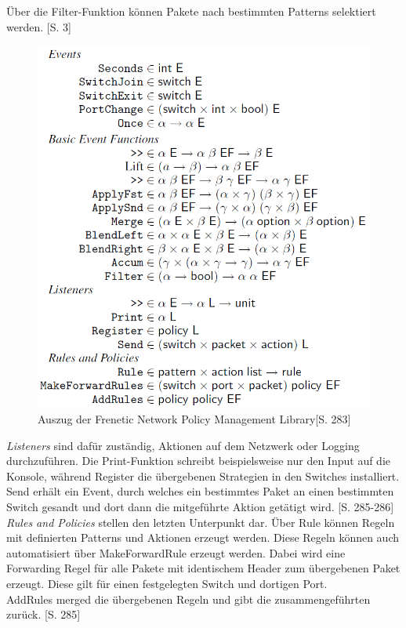 \documentclass[10pt,conference]{IEEEtran}
\begin{document}
Über die Filter-Funktion können Pakete nach bestimmten Patterns selektiert werden. \cite{3}[S. 3]
\begin{figure}[h]
	\centering
	\includegraphics[width=\columnwidth]{images/freneticNetworkPolicyManagementLibrary.PNG}
	\caption{Auszug der Frenetic Network Policy Management Library\cite{4}[S. 283]}
	\label{fig:freneticNetworkPolicyManagementLibrary}
\end{figure}
\newline
\textit{Listeners} sind dafür zuständig, Aktionen auf dem Netzwerk oder Logging durchzuführen. Die Print-Funktion schreibt beispielsweise nur den Input auf die Konsole, während Register die übergebenen Strategien in den Switches installiert. Send erhält ein Event, durch welches ein bestimmtes Paket an einen bestimmten Switch gesandt und dort dann die mitgeführte Aktion getätigt wird. \cite{3}[S. 285-286]\\
\newline
\textit{Rules and Policies} stellen den letzten Unterpunkt dar. Über Rule können Regeln mit definierten Patterns und Aktionen erzeugt werden. Diese Regeln können auch automatisiert über MakeForwardRule erzeugt werden. Dabei wird eine Forwarding Regel für alle Pakete mit identischem Header zum übergebenen Paket erzeugt. Diese gilt für einen festgelegten Switch und dortigen Port.\\
AddRules merged die übergebenen Regeln und gibt die zusammengeführten zurück. \cite{4}[S. 285] 
\end{document}
